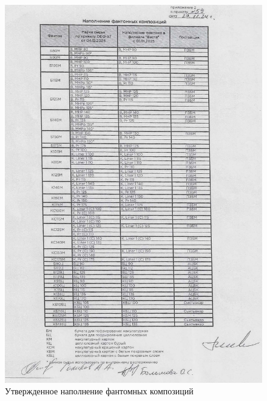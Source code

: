 \begin{figure}
\begin{center}
 \includegraphics[height=0.8\textheight, keepaspectratio]{Pics/VII 2.jpg}
\end{center}
 \caption{Утвержденное наполнение фантомных композиций}
 \label{pic:VII 2}
\end{figure}

\clearpage


















